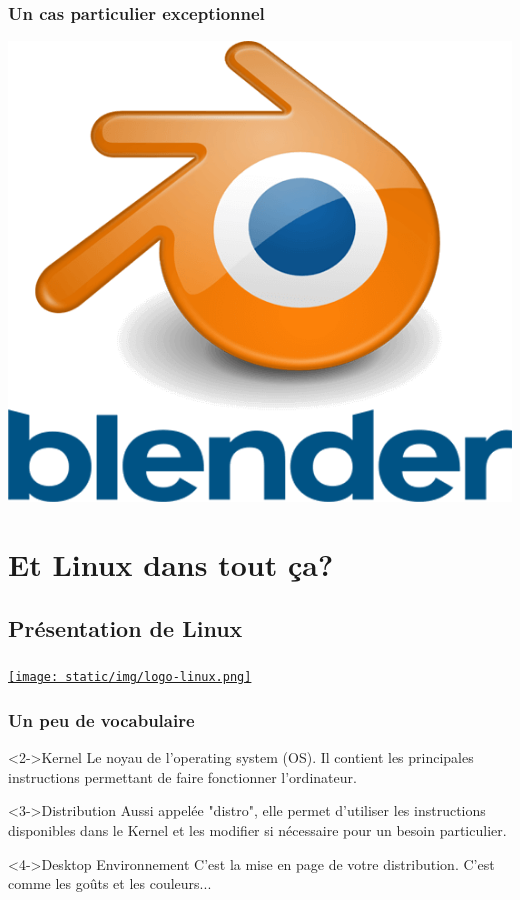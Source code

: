 \documentclass{beamer}
\begin{document}
\begin{frame}
	\frametitle{Un cas particulier exceptionnel}
	
	\begin{center}
		\href{https://www.blender.org/}{\includegraphics[width=.55\linewidth]{static/img/Blender.png}}
	\end{center}
	
\end{frame}

\section{Et Linux dans tout ça?}

\subsection{Présentation de Linux}
\begin{frame}
	\frametitle{\insertsection}
	\begin{center}
		\href{https://fr.wikipedia.org/wiki/Linux}{\texttt{[image: static/img/logo-linux.png]}}
	\end{center}
\end{frame}

\begin{frame}
	\frametitle{Un peu de vocabulaire}
	
	\begin{block}<2->{Kernel}
		Le noyau de l'operating system (OS). Il contient les principales instructions permettant de faire fonctionner l'ordinateur.
	\end{block}

	\begin{block}<3->{Distribution}
		Aussi appelée "distro", elle permet d'utiliser les instructions disponibles dans le Kernel et les modifier si nécessaire pour un besoin particulier.
	\end{block}

	\begin{block}<4->{Desktop Environnement}
		C'est la mise en page de votre distribution. C'est comme les goûts et les couleurs...
	\end{block}
	
\end{frame}
\end{document}

